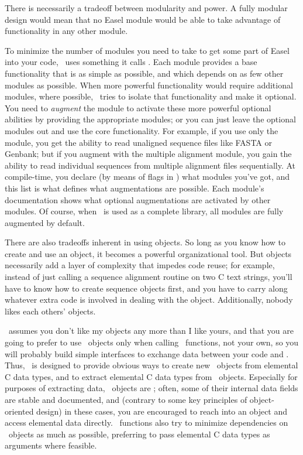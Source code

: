 There is necessarily a tradeoff between modularity and power. A fully
modular design would mean that no Easel module would be able to take
advantage of functionality in any other module. 

To minimize the number of modules you need to take to get some part of
Easel into your code, \Easel\ uses something it calls
. Each module provides a base functionality that
is as simple as possible, and which depends on as few other modules as
possible. When more powerful functionality would require additional
modules, where possible, \Easel\ tries to isolate that functionality
and make it optional. You need to \emph{augment} the module to
activate these more powerful optional abilities by providing the
appropriate modules; or you can just leave the optional modules out
and use the core functionality.  For example, if you use only the
 module, you get the ability to read unaligned sequence
files like FASTA or Genbank; but if you augment  with the
 multiple alignment module, you gain the ability to read
individual sequences from multiple alignment files sequentially. At
compile-time, you declare (by means of  flags in
) what modules you've got, and this list is what
defines what augmentations are possible. Each module's documentation
shows what optional augmentations are activated by other modules. Of
course, when \Easel\ is used as a complete  library,
all modules are fully augmented by default.

There are also tradeoffs inherent in using objects. So long as you
know how to create and use an object, it becomes a powerful
organizational tool. But objects necessarily add a layer of complexity
that impedes code reuse; for example, instead of just calling a
sequence alignment routine on two C text strings, you'll have to know
how to create sequence objects first, and you have to carry along
whatever extra code is involved in dealing with the
object. Additionally, nobody likes each others' objects.

\Easel\ assumes you don't like my objects any more than I like yours,
and that you are going to prefer to use \Easel\ objects only when
calling \Easel\ functions, not your own, so you will probably build
simple interfaces to exchange data between your code and \Easel. Thus,
\Easel\ is designed to provide obvious ways to create new \Easel\
objects from elemental C data types, and to extract elemental C data
types from \Easel\ objects. Especially for purposes of extracting
data, \Easel\ objects are \esldef{translucent}; often, some of their
internal data fields are stable and documented, and (contrary to some
key principles of object-oriented design) in these cases, you are
encouraged to reach into an object and access elemental data
directly. \Easel\ functions also try to minimize dependencies on
\Easel\ objects as much as possible, preferring to pass elemental C
data types as arguments where feasible.



